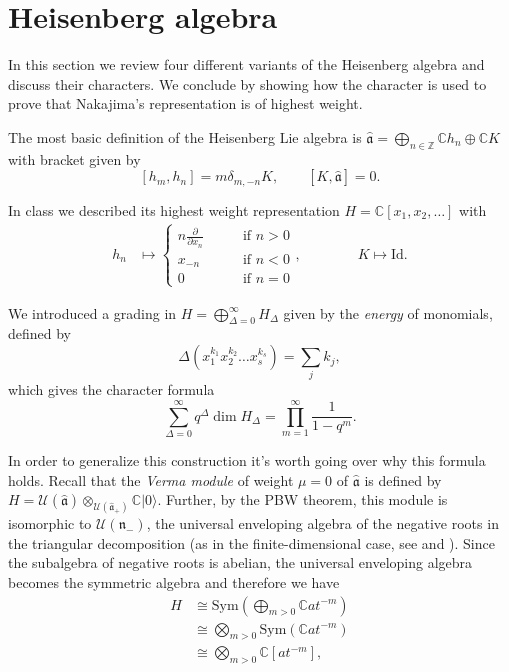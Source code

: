 \section{Heisenberg algebra}
\label{section-heisenberg}

\noindent
In this section we review four different
variants
of the Heisenberg algebra and discuss their
characters.
We conclude by showing how the character is
used
to prove that Nakajima's representation is
of highest weight.

\medskip\noindent
The most basic definition of the Heisenberg
Lie algebra is
$\hat{\mathfrak{a}}=
\bigoplus_{n \in \mathbb{Z}} \mathbb{C}h_n
\oplus\mathbb{C}K$
with bracket given by
\begin{equation}
\label{equation-bracket-basic}
[h_m,h_n]=m\delta_{m,-n}K,\qquad
[K,\hat{\mathfrak{a}}]=0.
\end{equation}

\noindent
In class we described its highest weight
representation
$H=\mathbb{C}[x_1,x_2,\ldots]$ with
\begin{align*}
h_n&\mapsto \begin{cases}
n \frac{\partial }{\partial x_n}\qquad
&\text{if }n>0\\
x_{-n}\qquad &\text{if }n<0\\
0\qquad &\text{if }n=0
\end{cases},
\qquad \qquad  K\mapsto \text{Id}.
\end{align*}

\noindent
We introduced a grading in
$H=\bigoplus_{\Delta=0}^\infty H_\Delta$
given by the {\it energy} of monomials,
defined by
$$
\Delta(x_1^{k_1}x_2^{k_2}\ldots
x_s^{k_s})=\sum_j k_j,
$$
which gives the character formula
\begin{equation}
\label{equation-character-heisenberg}
\sum_{\Delta=0}^\infty q^\Delta \dim H_\Delta
=\prod_{m=1}^\infty\frac{1}{1-q^m}.
\end{equation}

\noindent
In order to generalize this construction
it's worth going over why this formula holds.
Recall that the \textit{Verma module} of
weight $\mu=0$
of $\hat{\mathfrak{a}}$ is defined by
$H=
\mathcal{U}(\hat{\mathfrak{a}})
\otimes_{\mathcal{U}(\hat{\mathfrak{a}}_+)}
\mathbb{C}|0\rangle$.
Further, by the PBW theorem, this module
is isomorphic to
$\mathcal{U}(\mathfrak{n}_-)$,
the universal enveloping algebra
of the negative roots in the triangular
decomposition
(as in the finite-dimensional case, see
\cite[Lecture 24]{KLAL} and
\cite[Video 8]{videos}).
Since the subalgebra of negative roots is
abelian,
the universal enveloping algebra becomes the
symmetric algebra
and therefore we have
\begin{equation}
\label{equation-symmetric-rank-1}
\begin{aligned}
H&\cong\text{Sym}\left(\bigoplus_{m>0}\mathbb{C}at^{-m}\right)\\
&\cong\bigotimes_{m>0}\text{Sym}(\mathbb{C}at^{-m})\\
&\cong \bigotimes_{m>0}\mathbb{C}[at^{-m}],
\end{aligned}
\end{equation}

